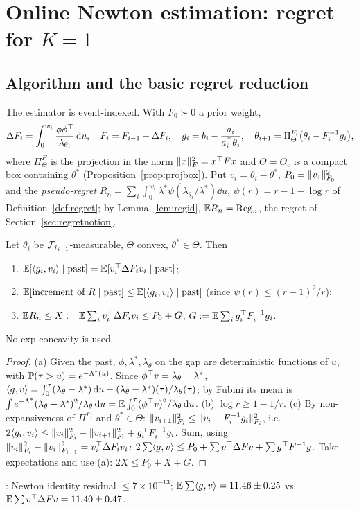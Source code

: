 \section{Online Newton estimation: regret for $K=1$}\label{sec:regret}

\subsection{Algorithm and the basic regret reduction}

The estimator is event-indexed. With $F_0\succ0$ a prior weight,
\[
\Delta F_i=\int_0^{w_i}\frac{\phi\phi\T}{\lambda_{\theta_i}}\dd u,\quad F_i=F_{i-1}+\Delta F_i,\quad
g_i=b_i-\frac{a_i}{a_i\T\theta_i},\quad \theta_{i+1}=\Pi^{F_i}_{\Theta}\big(\theta_i-F_i^{-1}g_i\big),
\]
where $\Pi^{F}_\Theta$ is the projection in the norm $\norm x_F^2=x\T Fx$ and $\Theta=\Theta_c$ is a compact box containing $\theta^*$ (Proposition~\ref{prop:projbox}).
Put $v_i=\theta_i-\theta^*$, $P_0=\norm{v_1}_{F_0}^2$ and the \emph{pseudo-regret}
$R_n=\sum_i\int_0^{w_i}\lambda^*\psi(\lambda_{\theta_i}/\lambda^*)\dd u$, $\psi(r)=r-1-\log r$ of Definition~\ref{def:regret}; by Lemma~\ref{lem:regid}, $\E R_n=\mathrm{Reg}_n$, the regret of Section~\ref{sec:regretnotion}.

\begin{proposition}\label{prop:reg}\Pt{}
Let $\theta_i$ be $\cF_{t_{i-1}}$-measurable, $\Theta$ convex, $\theta^*\in\Theta$. Then
\begin{enumerate}[label=(\alph*),nosep]
\item $\E[\ip{g_i}{v_i}\mid\text{past}]=\E[v_i\T\Delta F_iv_i\mid\text{past}]$;
\item $\E[\text{increment of }R\mid\text{past}]\le\E[\ip{g_i}{v_i}\mid\text{past}]$ (since $\psi(r)\le(r-1)^2/r$);
\item $\E R_n\le X:=\E\sum_iv_i\T\Delta F_iv_i\le P_0+G$, $G:=\E\sum_ig_i\T F_i^{-1}g_i$.
\end{enumerate}
No exp-concavity is used.
\end{proposition}
\begin{proof}
(a) Given the past, $\phi,\lambda^*,\lambda_\theta$ on the gap are deterministic functions of $u$, with $\P(\tau>u)=e^{-\Lambda^*(u)}$. Since $\phi\T v=\lambda_\theta-\lambda^*$, $\ip gv=\int_0^\tau(\lambda_\theta-\lambda^*)\dd u-(\lambda_\theta-\lambda^*)(\tau)/\lambda_\theta(\tau)$; by Fubini its mean is $\int e^{-\Lambda^*}(\lambda_\theta-\lambda^*)^2/\lambda_\theta\dd u=\E\int_0^\tau(\phi\T v)^2/\lambda_\theta\dd u$.
(b) $\log r\ge1-1/r$. (c) By non-expansiveness of $\Pi^{F_i}$ and $\theta^*\in\Theta$: $\norm{v_{i+1}}_{F_i}^2\le\norm{v_i-F_i^{-1}g_i}_{F_i}^2$, i.e.\ $2\ip{g_i}{v_i}\le\norm{v_i}_{F_i}^2-\norm{v_{i+1}}_{F_i}^2+g_i\T F_i^{-1}g_i$. Sum, using $\norm{v_i}_{F_i}^2-\norm{v_i}_{F_{i-1}}^2=v_i\T\Delta F_iv_i$: $2\sum\ip gv\le P_0+\sum v\T\Delta Fv+\sum g\T F^{-1}g$. Take expectations and use (a): $2X\le P_0+X+G$.
\end{proof}
\Nt{}: Newton identity residual $\le7\times10^{-13}$; $\E\sum\ip gv=11.46\pm0.25$ vs $\E\sum v\T\Delta Fv=11.40\pm0.47$.

